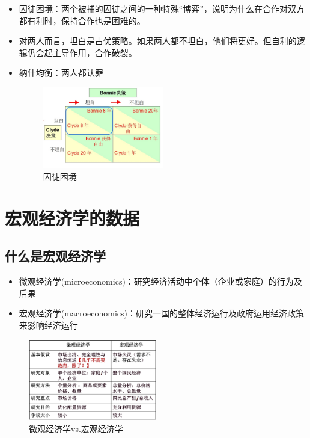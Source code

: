 \documentclass[12pt, a4paper]{article}
\begin{document}
\begin{itemize}
  \item 囚徒困境：两个被捕的囚徒之间的一种特殊“博弈”，说明为什么在合作对双方都有利时，保持合作也是困难的。
  \item 对两人而言，坦白是占优策略。如果两人都不坦白，他们将更好。但自利的逻辑仍会起主导作用，合作破裂。
  \item 纳什均衡：两人都认罪
  
  \begin{figure}[H] 
    \centering %
    \includegraphics[width=0.5\textwidth]{囚徒困境.png} 
    \caption{囚徒困境} %
  \end{figure}


\end{itemize}

\newpage
\section{宏观经济学的数据}

\subsection{什么是宏观经济学}
\begin{itemize}
  \item 微观经济学(microeconomics)：研究经济活动中个体（企业或家庭）的行为及后果
  \item 宏观经济学(macroeconomics)：研究一国的整体经济运行及政府运用经济政策来影响经济运行
\end{itemize}

\begin{figure}[H]
  \centering
  \includegraphics[width=0.5\textwidth]{微观经济学vs宏观经济学.png}
  \caption{微观经济学vs.宏观经济学}
\end{figure}
\end{document}
